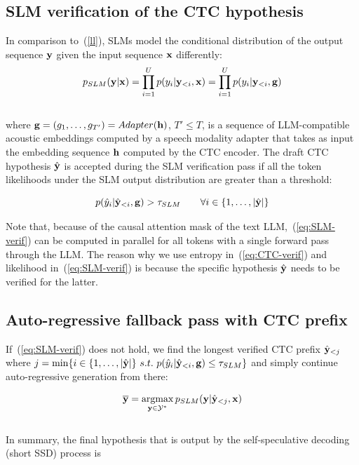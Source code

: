 \documentclass[cameraready]{Interspeech}
\def\argmax{\mathop{\rm argmax}}
\begin{document}
\subsection{SLM verification of the CTC hypothesis}
\label{subsec:SLM-verif}
In comparison to~(\ref{ll}), SLMs model the conditional distribution of the output sequence ${\bf y}$ given the input sequence ${\bf x}$ differently:
\begin{equation}
p_{SLM}({\bf y}|{\bf x})=\prod_{i=1}^U p(y_i|{\bf y}_{<i},{\bf x})=\prod_{i=1}^U p(y_i|{\bf y}_{<i},{\bf g})
\end{equation}
~~\\
where ${\bf g}=(g_1,\ldots,g_{T'})=Adapter({\bf h})$, $T'\le T$, is a sequence of LLM-compatible acoustic embeddings computed by a speech modality adapter that takes as input the embedding sequence ${\bf h}$ computed by the CTC encoder. The draft CTC hypothesis $\hat{\bf y}$ is accepted during the SLM verification pass if all the token likelihoods under the SLM output distribution are greater than a threshold:

\begin{equation}
p(\hat{y}_i|\hat{{\bf y}}_{<i},{\bf g}) > \tau_{SLM}\qquad\forall i\in\{1,\ldots,|\hat{\bf y}|\}
\label{eq:SLM-verif}
\end{equation}

Note that, because of the causal attention mask of the text LLM,~(\ref{eq:SLM-verif}) can be computed in parallel for all tokens with a single forward pass through the LLM. The reason why we use entropy in~(\ref{eq:CTC-verif}) and likelihood in~(\ref{eq:SLM-verif}) is because the specific hypothesis $\hat{{\bf y}}$ needs to be verified for the latter.  

\subsection{Auto-regressive fallback pass with CTC prefix}
\label{subsec:SLM-AR}
If~(\ref{eq:SLM-verif}) does not hold, we find the longest verified CTC prefix $\hat{{\bf y}}_{<j}$ where $j=\min\{i\in\{1,\ldots,|\hat{\bf y}|\}~s.t.~p(\hat{y}_i|\hat{{\bf y}}_{<i},{\bf g}) \le \tau_{SLM}\}$ and simply continue auto-regressive generation from there:

\begin{equation}
\overline{\bf y}=\argmax_{{\bf y}\in{\cal Y}^*}p_{SLM}({\bf y}|\hat{{\bf y}}_{<j},{\bf x})
\end{equation}
~~\\
In summary, the final hypothesis that is output by the self-speculative decoding (short SSD) process is
\end{document}
